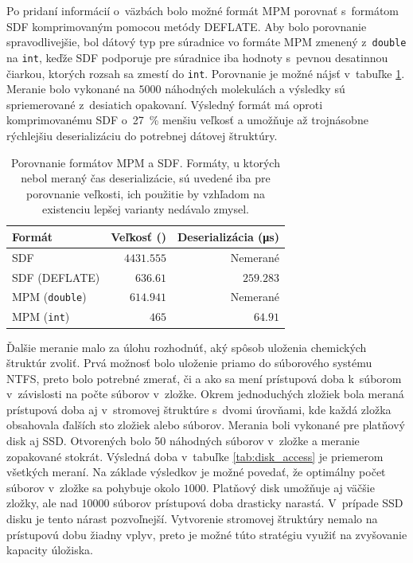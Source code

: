 \documentclass[slovak]{ExcelAtFIT} %
\begin{document}
Po pridaní informácií o~väzbách bolo možné formát MPM porovnať s~formátom SDF komprimovaným pomocou metódy DEFLATE. Aby bolo porovnanie spravodlivejšie, bol dátový typ pre súradnice vo formáte MPM zmenený z~\texttt{double} na \texttt{int}, keďže SDF podporuje pre súradnice iba hodnoty s~pevnou desatinnou čiarkou, ktorých rozsah sa zmestí do \texttt{int}. Porovnanie je možné nájsť v~tabuľke \ref{tab:sdfvsmpm}. Meranie bolo vykonané na $5000$ náhodných molekulách a výsledky sú spriemerované z~desiatich opakovaní. Výsledný formát má oproti komprimovanému SDF o~\SI{27}{\percent} menšiu veľkosť a umožňuje až trojnásobne rýchlejšiu deserializáciu do potrebnej dátovej štruktúry.

\begin{table}[h]
	\vskip6pt
	\caption{Porovnanie formátov MPM a SDF. Formáty, u ktorých nebol meraný čas deserializácie, sú uvedené iba pre porovnanie veľkosti, ich použitie by vzhľadom na existenciu lepšej varianty nedávalo zmysel.}
	\centering
	\begin{tabular}{l|r|r}
		\toprule
		Formát & Veľkosť (\si{\byte}) & Deserializácia (\si{\micro\second}) \\
		\midrule
		SDF & $4431.555$ & Nemerané \\
		SDF (DEFLATE) & $636.61$ & $259.283$ \\
		MPM (\texttt{double}) & $614.941$ & Nemerané \\
		MPM (\texttt{int}) & $465$ & $64.91$ \\
		\bottomrule
	\end{tabular}
	\label{tab:sdfvsmpm}
\end{table}

Ďalšie meranie malo za úlohu rozhodnúť, aký spô\-sob uloženia chemických štruktúr zvoliť. Prvá možnosť bolo uloženie priamo do súborového systému NTFS, preto bolo potrebné zmerať, či a ako sa mení prístupová doba k~súborom v~závislosti na počte súborov v~zložke. Okrem jednoduchých zložiek bola meraná prístupová doba aj v~stromovej štruktúre s~dvomi úrovňami, kde každá zložka obsahovala ďalších sto zložiek alebo súborov. Merania boli vykonané pre platňový disk aj SSD. Otvorených bolo 50 náhodných súborov v~zložke a meranie zopakované stokrát. Výsledná doba v~tabuľke \ref{tab:disk_access} je priemerom všetkých meraní. Na základe výsledkov je možné povedať, že optimálny počet sú\-bo\-rov v~zložke sa pohybuje okolo $1000$. Platňový disk u\-mož\-ňu\-je aj väčšie zložky, ale nad $10000$ súborov prístupová doba drasticky narastá. V~prípade SSD disku je tento nárast pozvoľnejší. Vytvorenie stromovej štruktúry nemalo na prístupovú dobu žiadny vplyv, preto je možné túto stratégiu využiť na zvyšovanie kapacity úložiska. 
\end{document}
